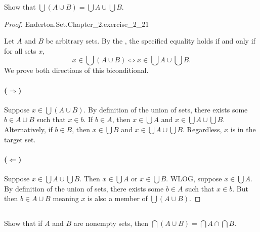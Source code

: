 \documentclass{report}
\begin{document}
Show that $\bigcup (A \cup B) = \bigcup A \cup \bigcup B$.

\begin{proof}

    {Enderton.Set.Chapter\_2.exercise\_2\_21}

  Let $A$ and $B$ be arbitrary sets.
  By the , the specified equality holds if and
    only if for all sets $x$,
    $$x \in \bigcup (A \cup B) \iff x \in \bigcup A \cup \bigcup B.$$
  We prove both directions of this biconditional.

  \paragraph{($\Rightarrow$)}%

    Suppose $x \in \bigcup (A \cup B)$.
    By definition of the union of sets, there exists some $b \in A \cup B$ such
      that $x \in b$.
    If $b \in A$, then $x \in \bigcup A$ and $x \in \bigcup A \cup \bigcup B$.
    Alternatively, if $b \in B$, then $x \in \bigcup B$ and
      $x \in \bigcup A \cup \bigcup B$.
    Regardless, $x$ is in the target set.

  \paragraph{($\Leftarrow$)}%

    Suppose $x \in \bigcup A \cup \bigcup B$.
    Then $x \in \bigcup A$ or $x \in \bigcup B$.
    WLOG, suppose $x \in \bigcup A$.
    By definition of the union of sets, there exists some $b \in A$ such that
      $x \in b$.
    But then $b \in A \cup B$ meaning $x$ is also a member of
      $\bigcup (A \cup B)$.

\end{proof}

\subsection{}%
\label{sub:exercise-2.22}

Show that if $A$ and $B$ are nonempty sets, then
  $\bigcap (A \cup B) = \bigcap A \cap \bigcap B$.
\end{document}
